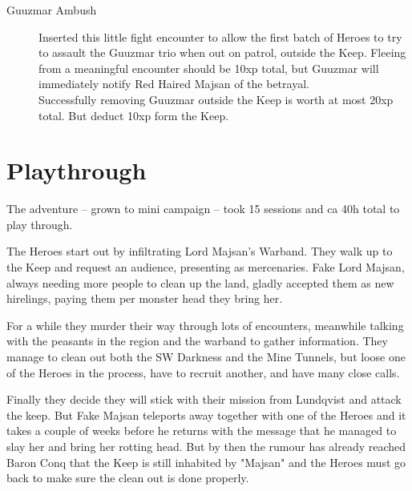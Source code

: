 \begin{description}

\item[Guuzmar Ambush] Inserted this little fight encounter to allow the first batch of Heroes to try to assault the Guuzmar trio when out on patrol, outside the Keep.
Fleeing from a meaningful encounter should be 10xp total, but Guuzmar will immediately notify Red Haired Majsan of the betrayal.\\
Successfully removing Guuzmar outside the Keep is worth at most 20xp total. But deduct 10xp form the Keep.

\end{description}


















\clearpage
{}
\section*{Playthrough}
The adventure -- grown to mini campaign -- took 15 sessions and ca 40h total to play through.

The Heroes start out by infiltrating Lord Majsan's Warband. They walk up to the Keep and request an audience, presenting as mercenaries. Fake Lord Majsan, always needing more people to clean up the land, gladly accepted them as new hirelings, paying them per monster head they bring her.

For a while they murder their way through lots of encounters, meanwhile talking with the peasants in the region and the warband to gather information. They manage to clean out both the SW Darkness and the Mine Tunnels, but loose one of the Heroes in the process, have to recruit another, and have many close calls.

Finally they decide they will stick with their mission from Lundqvist and attack the keep. But Fake Majsan teleports away together with one of the Heroes and it takes a couple of weeks before he returns with the message that he managed to slay her and bring her rotting head. But by then the rumour has already reached Baron Conq that the Keep is still inhabited by "Majsan" and the Heroes must go back to make sure the clean out is done properly.

